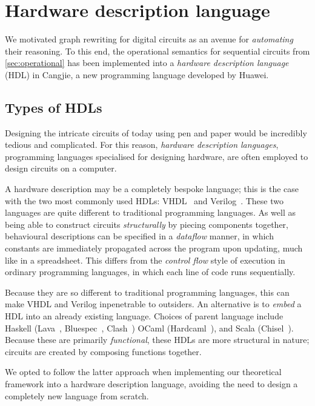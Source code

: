 \section{Hardware description language}

We motivated graph rewriting for digital circuits as an avenue for
\emph{automating} their reasoning.
To this end, the operational semantics for sequential circuits from
\cref{sec:operational} has been implemented into a
\emph{hardware description language} (HDL) in Cangjie, a new programming
language developed by Huawei.

\subsection{Types of HDLs}

Designing the intricate circuits of today using pen and paper would be
incredibly tedious and complicated.
For this reason, \emph{hardware description languages}, programming languages
specialised for designing hardware, are often employed to design circuits on a
computer.

A hardware description may be a completely bespoke language; this is the case
with the two most commonly used HDLs: VHDL~\cite{ieeecomputersociety1988ieee}
and Verilog~\cite{ieeecomputersociety1996ieee}.
These two languages are quite different to traditional programming languages.
As well as being able to construct circuits \emph{structurally} by piecing
components together, behavioural descriptions
can be specified in a \emph{dataflow} manner, in which constants are immediately
propagated across the program upon updating, much like in a spreadsheet.
This differs from the \emph{control flow} style of execution in ordinary
programming languages, in which each line of code runs sequentially.

Because they are so different to traditional programming languages, this can
make VHDL and Verilog inpenetrable to outsiders.
An alternative is to \emph{embed} a HDL into an already existing language.
Choices of parent language include Haskell
(Lava~\cite{bjesse1998lava}, Bluespec~\cite{nikhil2004bluespec}, Clash~\cite{kooijman2009haskell,baaij2010clash})
OCaml (Hardcaml~\cite{ray2023hardcaml}), and Scala (Chisel~\cite{bachrach2012chisel}).
Because these are primarily \emph{functional}, these HDLs are more structural in
nature; circuits are created by composing functions together.

We opted to follow the latter approach when implementing our theoretical
framework into a hardware description language, avoiding the need to design a
completely new language from scratch.

